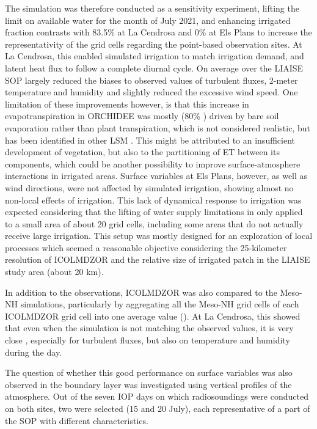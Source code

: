 The \irrboost simulation was therefore conducted as a sensitivity experiment, lifting the limit on available water for the month of July 2021, and enhancing irrigated fraction contrasts with 83.5\% at La Cendrosa and 0\% at Els Plans to increase the representativity of the grid cells regarding the point-based observation sites. 
At La Cendrosa, this enabled simulated irrigation to match irrigation demand, and latent heat flux to follow a complete diurnal cycle. On average over the LIAISE SOP \irrboost largely reduced the biases to observed values of turbulent fluxes, 2-meter temperature and humidity and slightly reduced the excessive wind speed. 
One limitation of these improvements however, is that this increase in evapotranspiration in ORCHIDEE was mostly (80\% %
) driven by bare soil evaporation rather than plant transpiration, which is not considered realistic, but has been identified in other LSM \citep{marti_implementation_2025}. %
This might be attributed to an insufficient development of vegetation, but also to the partitioning of ET between its components, which could be another possibility to improve surface-atmosphere interactions in irrigated areas.
Surface variables at Els Plans, however, as well as wind directions, were not affected by simulated irrigation, showing almost no non-local effects of irrigation. 
This lack of dynamical response to irrigation was expected considering that the lifting of water supply limitations in \irrboost only applied to a small area of about 20 grid cells, including some areas that do not actually receive large irrigation. This setup was mostly designed for an exploration of local processes which seemed a reasonable objective considering the 25-kilometer resolution of ICOLMDZOR and the relative size of irrigated patch in the LIAISE study area (about 20 km).

In addition to the observations, ICOLMDZOR was also compared to the Meso-NH simulations, particularly by aggregating all the Meso-NH grid cells of each ICOLMDZOR grid cell into one average value (\mesomean). At La Cendrosa, this showed that even when the \irrboost simulation is not matching the observed values, it is very close \mesomean, especially for turbulent fluxes, but also on temperature and humidity during the day. 

\hfill

The question of whether this good performance on surface variables was also observed in the boundary layer was investigated using vertical profiles of the atmosphere. Out of the seven IOP days on which radiosoundings were conducted on both sites, two were selected (15 and 20 July), each representative of a part of the SOP with different characteristics.


